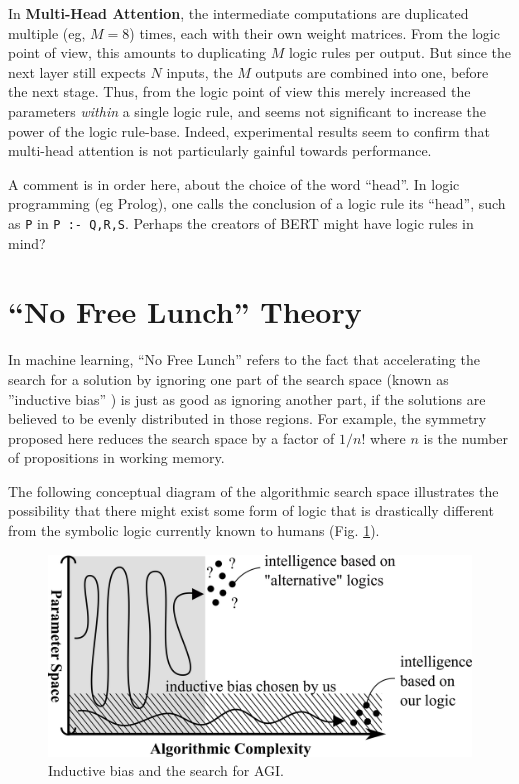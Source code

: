 \documentclass[orivec]{llncs}
\begin{document}
In \textbf{Multi-Head Attention}, the intermediate computations are duplicated multiple (eg, $M = 8$) times, each with their own weight matrices.  From the logic point of view, this amounts to duplicating $M$ logic rules per output.  But since the next layer still expects $N$ inputs, the $M$ outputs are combined into one, before the next stage.  Thus, from the logic point of view this merely increased the parameters \textit{within} a single logic rule, and seems not significant to increase the power of the logic rule-base.  Indeed, experimental results seem to confirm that multi-head attention is not particularly gainful towards performance.

A comment is in order here, about the choice of the word ``head''.  In logic programming (eg Prolog), one calls the conclusion of a logic rule its ``head'', such as \texttt{P} in \texttt{P :- Q,R,S}.  Perhaps the creators of BERT might have logic rules in mind?

\section{``No Free Lunch'' Theory}

In machine learning, ``No Free Lunch'' \cite{Wolpert1997} \cite{Alpaydin2020} refers to the fact that accelerating the search for a solution by ignoring one part of the search space (known as ''inductive bias'' \cite{Alpaydin2020}) is just as good as ignoring another part, if the solutions are believed to be evenly distributed in those regions.  For example, the symmetry proposed here reduces the search space by a factor of $1/n!$ where $n$ is the number of propositions in working memory.

The following conceptual diagram of the algorithmic search space illustrates the possibility that there might exist some form of logic that is drastically different from the symbolic logic currently known to humans (Fig. \ref{fig:inductive-bias}).

\begin{figure}[h]
\centering
\includegraphics[scale=0.45]{no-free-lunch.png}
\caption{Inductive bias and the search for AGI.}
\label{fig:inductive-bias}
\end{figure}
\end{document}
